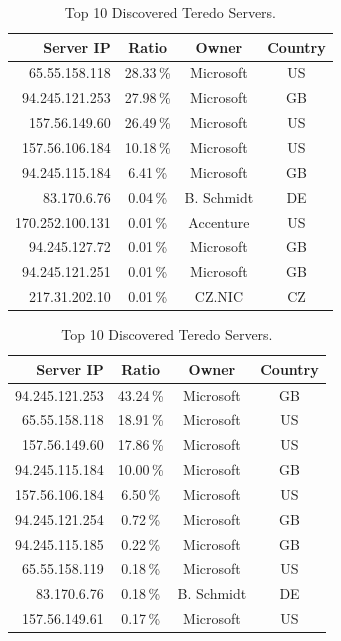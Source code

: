 \begin{table}
    \centering
    \begin{subtable}{\textwidth}
        \small
        \centering
        \begin{tabular}{rccc}
            \textbf{Server IP} & \textbf{Ratio} & \textbf{Owner} & \textbf{Country} \\ \toprule 
            65.55.158.118 & 28.33\,\% & Microsoft & US \\
            94.245.121.253 & 27.98\,\% & Microsoft & GB \\
            157.56.149.60 & 26.49\,\% & Microsoft & US \\
            157.56.106.184 & 10.18\,\% & Microsoft & US \\
            94.245.115.184 & 6.41\,\% & Microsoft & GB \\
            83.170.6.76 & 0.04\,\% & B. Schmidt & DE \\
            170.252.100.131 & 0.01\,\% & Accenture & US \\
            94.245.127.72 & 0.01\,\% & Microsoft & GB \\
            94.245.121.251 & 0.01\,\% & Microsoft & GB \\
            217.31.202.10 & 0.01\,\% & CZ.NIC & CZ \\ \bottomrule
        \end{tabular}
        \caption{Based on Teredo IPv6 Addresses.}
        \label{tab:ipv6-tunnels-teredo-servers}
    \end{subtable}
    \par\medskip
    \begin{subtable}{\textwidth}
        \small
        \centering
        \begin{tabular}{rccc}
            \textbf{Server IP} & \textbf{Ratio} & \textbf{Owner} & \textbf{Country} \\ \toprule 
            94.245.121.253 & 43.24\,\% & Microsoft & GB \\
            65.55.158.118 & 18.91\,\% & Microsoft & US \\
            157.56.149.60 & 17.86\,\% & Microsoft & US \\
            94.245.115.184 & 10.00\,\% & Microsoft & GB \\
            157.56.106.184 & 6.50\,\% & Microsoft & US \\
            94.245.121.254 & 0.72\,\% & Microsoft & GB \\
            94.245.115.185 & 0.22\,\% & Microsoft & GB \\
            65.55.158.119 & 0.18\,\% & Microsoft & US \\
            83.170.6.76 & 0.18\,\% & B. Schmidt & DE \\
            157.56.149.61 & 0.17\,\% & Microsoft & US \\ \bottomrule
        \end{tabular}
        \caption{Based on UDP Port 3544}
        \label{tab:ipv6-tunnels-teredo-servers-3544}
    \end{subtable}
    \caption{Top 10 Discovered Teredo Servers.}
\end{table}

